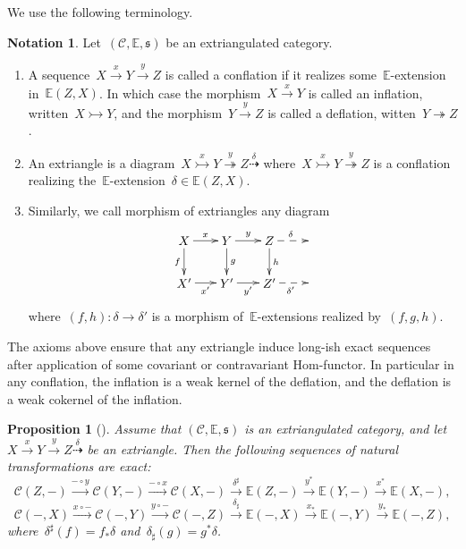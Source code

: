 \documentclass{amsart}
\newtheorem{proposition}[theorem]{Proposition}
\theoremstyle{definition}
\newtheorem{notation}[theorem]{Notation}
\newcommand{\cat}{\mathcal{C}}
\newcommand{\infl}{\rightarrowtail}
\newcommand{\defl}{\twoheadrightarrow}
\begin{document}
\enlargethispage{-.8cm}
We use the following terminology.

\begin{notation}
Let~$(\cat,\mathbb{E},\mathfrak{s})$ be an extriangulated category.
\begin{enumerate}
\item A sequence~$X\xrightarrow{x}Y\xrightarrow{y}Z$ is called a conflation if it realizes some~$\mathbb{E}$-extension in~$\mathbb{E}(Z,X)$. In which case the morphism~$X\xrightarrow{x}Y$ is called an inflation, written~$X\infl Y$, and the morphism~$Y\xrightarrow{y}Z$ is called a deflation, witten~$Y\defl Z$.
\item An extriangle is a diagram~$X\overset{x}{\infl} Y\overset{y}{\defl} Z\overset{\delta}{\dashrightarrow}$ where~$X\overset{x}{\infl} Y\overset{y}{\defl} Z$ is a conflation realizing the~$\mathbb{E}$-extension~$\delta\in\mathbb{E}(Z,X)$.
\item Similarly, we call morphism of extriangles any diagram
\[
\xy
(-12,6)*+{X}="0";
(0,6)*+{Y}="2";
(12,6)*+{Z}="4";
(24,6)*+{}="6";
%
(-12,-6)*+{X'}="10";
(0,-6)*+{Y'}="12";
(12,-6)*+{Z'}="14";
(24,-6)*+{}="16";
%
{\ar^{x} "0";"2"};
{\ar^{y} "2";"4"};
{\ar@{-->}^{\delta} "4";"6"};
%
{\ar_{f} "0";"10"};
{\ar^{g} "2";"12"};
{\ar^{h} "4";"14"};
%
{\ar_{x'} "10";"12"};
{\ar_{y'} "12";"14"};
{\ar@{-->}_{\delta'} "14";"16"};
%
{\ar@{}|{} "0";"12"};
{\ar@{}|{} "2";"14"};
\endxy
\]
where~$(f,h):\delta\to\delta'$ is a morphism of~$\mathbb{E}$-extensions realized by~$(f,g,h)$.
\end{enumerate}
\end{notation}

The axioms above ensure that any extriangle induce long-ish exact sequences after application of some covariant or contravariant Hom-functor.
In particular in any conflation, the inflation is a weak kernel of the deflation, and the deflation is a weak cokernel of the inflation.

\begin{proposition}[{\cite[Props.~3.3~\&~3.11]{NakaokaPalu}}]
\label{prop:extricat long exact sequences}
Assume that $(\cat,\mathbb{E},\mathfrak{s})$ is an extriangulated category, and let $X\xrightarrow{x}Y\xrightarrow{y}Z\overset{\delta}{\dashrightarrow}$ be an extriangle.
Then the following sequences of natural transformations are exact:
\[
\cat(Z,-)\overset{-\circ y}{\longrightarrow}\cat(Y,-)\overset{-\circ x}{\longrightarrow}\cat(X,-)\overset{\delta^\sharp}{\longrightarrow}\mathbb{E}(Z,-)\overset{y^\ast}{\longrightarrow}\mathbb{E}(Y,-)\overset{x^\ast}{\longrightarrow}\mathbb{E}(X,-),
\]
\[
\cat(-,X)\overset{x\circ-}{\longrightarrow}\cat(-,Y)\overset{y\circ-}{\longrightarrow}\cat(-,Z)\overset{\delta_\sharp}{\longrightarrow}\mathbb{E}(-,X)\overset{x_\ast}{\longrightarrow}\mathbb{E}(-,Y)\overset{y_\ast}{\longrightarrow}\mathbb{E}(-,Z),
\]
where~$\delta^\sharp(f)=f_\ast\delta$ and~$\delta_\sharp(g)=g^\ast\delta$.
\end{proposition}
\end{document}
